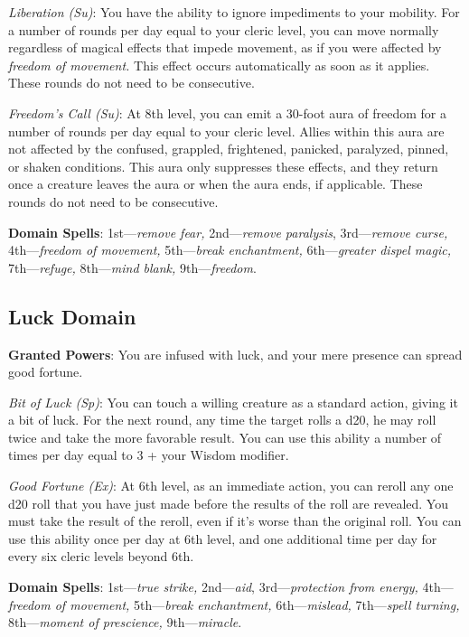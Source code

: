 \textit{Liberation (Su)}: You have the ability to ignore impediments to your mobility. For a number of rounds per day equal to your cleric level, you can move normally regardless of magical effects that impede movement, as if you were affected by \textit{freedom of movement.} This effect occurs automatically as soon as it applies. These rounds do not need to be consecutive.
				
\textit{Freedom's Call (Su)}: At 8th level, you can emit a 30-foot aura of freedom for a number of rounds per day equal to your cleric level. Allies within this aura are not affected by the confused, grappled, frightened, panicked, paralyzed, pinned, or shaken conditions. This aura only suppresses these effects, and they return once a creature leaves the aura or when the aura ends, if applicable. These rounds do not need to be consecutive. 
				
\textbf{Domain Spells}: 1st---\textit{remove fear, }2nd---\textit{remove paralysis}, 3rd---\textit{remove curse, }4th---\textit{freedom of movement, }5th---\textit{break enchantment, }6th---\textit{greater dispel magic, }7th---\textit{refuge, }8th---\textit{mind blank, }9th---\textit{freedom}.
				
\subsection{Luck Domain}

				
\textbf{Granted Powers}: You are infused with luck, and your mere presence can spread good fortune.
				
\textit{Bit of Luck (Sp)}: You can touch a willing creature as a standard action, giving it a bit of luck. For the next round, any time the target rolls a d20, he may roll twice and take the more favorable result. You can use this ability a number of times per day equal to 3 + your Wisdom modifier.
				
\textit{Good Fortune (Ex)}: At 6th level, as an immediate action, you can reroll any one d20 roll that you have just made before the results of the roll are revealed. You must take the result of the reroll, even if it's worse than the original roll. You can use this ability once per day at 6th level, and one additional time per day for every six cleric levels beyond 6th.
				
\textbf{Domain Spells}: 1st---\textit{true strike, }2nd---\textit{aid}, 3rd---\textit{protection from energy, }4th---\textit{freedom of movement, }5th---\textit{break enchantment, }6th---\textit{mislead, }7th---\textit{spell turning, }8th---\textit{moment of prescience, }9th---\textit{miracle}.
				
